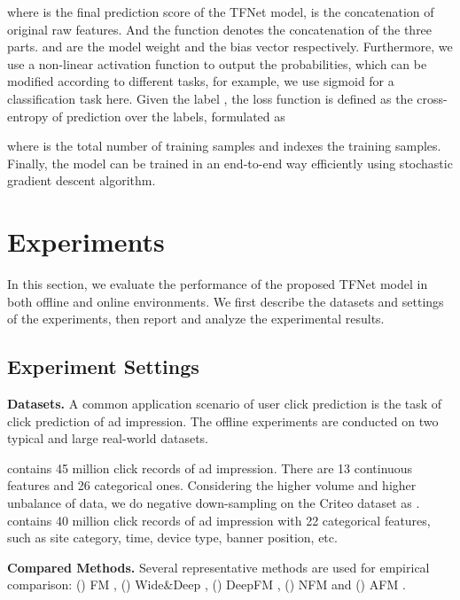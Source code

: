 \documentclass[sigconf]{acmart}
\begin{document}
\noindent where  is the final prediction score of the TFNet model,  is the concatenation of original raw features. And the  function denotes the concatenation of the three parts.  and  are the model weight and the bias vector respectively. Furthermore, we use a non-linear activation function  to output the probabilities, which can be modified according to different tasks, for example, we use sigmoid for a classification task here. Given the label , the loss function is defined as the cross-entropy of prediction over the labels, formulated as 

where  is the total number of training samples and  indexes the training samples. Finally, the model can be trained in an end-to-end way efficiently using stochastic gradient descent algorithm.






\section{Experiments}
In this section, we evaluate the performance of the proposed TFNet model in both offline and online environments. We first describe the datasets and settings of the experiments, then report and analyze the experimental results. 

\subsection{Experiment Settings}
\textbf{Datasets.} A common application scenario of user click prediction is the task of click prediction of ad impression. The offline experiments are conducted on two typical and large real-world datasets.


 contains 45 million click records of ad impression. There are 13 continuous features and 26 categorical ones. Considering the higher volume and higher unbalance of data, we do negative down-sampling on the Criteo dataset as \cite{qu2018product}.  contains 40 million click records of ad impression with 22 categorical features, such as site category, time, device type, banner position, etc. 




\textbf{Compared Methods.} Several representative methods are used for empirical comparison: () {FM} \cite{rendle2012factorization} , () {Wide\&Deep} \cite{cheng2016wide} , () {DeepFM} \cite{guo2017deepfm} , () {NFM} \cite{he2017neural} and () {AFM} \cite{xiao2017attentional}.
\end{document}

